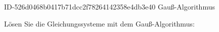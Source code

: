 \begin{exercise}
      {ID-526d0468b0417b71dcc2f78264142358e4db3e40}
      {Gauß-Algorithmus}
  \ifproblem\problem\par
    Lösen Sie die Gleichungssysteme mit dem Gauß-Algorithmus:
    \begingroup
      \newcommand{\slea}
      {%
        \text{a)}\;\;
        \begin{pmatrix}
          \num{6}  & \num{9} & \num{1}  \\
          \num{4}  & \num{9} & -\num{3} \\
          -\num{4} & \num{7} & -\num{3}
        \end{pmatrix}
        \cdot
        \begin{pmatrix}r\\s\\t\end{pmatrix}
        &=
        \begin{pmatrix}
          \num{16} \\
          -\num{6} \\
          \num{12}
        \end{pmatrix}
      }%
      \newcommand{\sleb}
      {%
        \text{b)}\;\;
        \begin{pmatrix}
          \num{2} & -\num{6} & \num{9}  \\
          \num{6} & \num{4}  & -\num{5} \\
          \num{4} & \num{2}  & -\num{7}
        \end{pmatrix}
        \cdot
        \begin{pmatrix}x\\y\\z\end{pmatrix}
        &=
        \begin{pmatrix}
          \num{13} \\

\end{pmatrix}}
\end{exercise}
